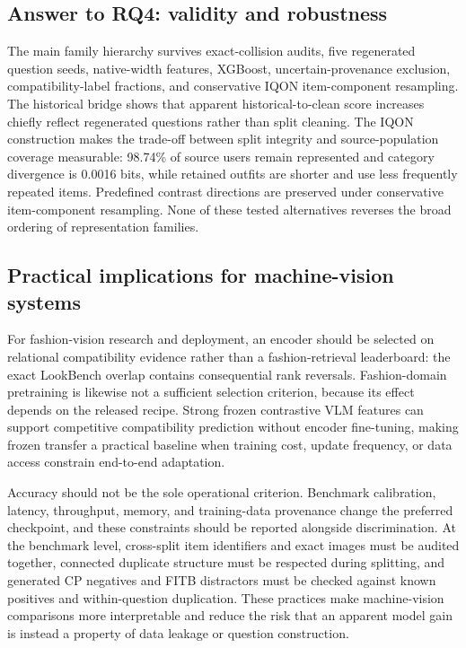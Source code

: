 \documentclass[pdflatex,sn-mathphys-num,iicol]{sn-jnl}
\begin{document}
\subsection{Answer to RQ4: validity and robustness}

The main family hierarchy survives exact-collision audits, five regenerated question seeds, native-width features, XGBoost, uncertain-provenance exclusion, compatibility-label fractions, and conservative IQON item-component resampling. The historical bridge shows that apparent historical-to-clean score increases chiefly reflect regenerated questions rather than split cleaning. The IQON construction makes the trade-off between split integrity and source-population coverage measurable: 98.74\% of source users remain represented and category divergence is 0.0016 bits, while retained outfits are shorter and use less frequently repeated items. Predefined contrast directions are preserved under conservative item-component resampling. None of these tested alternatives reverses the broad ordering of representation families.

\subsection{Practical implications for machine-vision systems}

For fashion-vision research and deployment, an encoder should be selected on relational compatibility evidence rather than a fashion-retrieval leaderboard: the exact LookBench overlap contains consequential rank reversals. Fashion-domain pretraining is likewise not a sufficient selection criterion, because its effect depends on the released recipe. Strong frozen contrastive VLM features can support competitive compatibility prediction without encoder fine-tuning, making frozen transfer a practical baseline when training cost, update frequency, or data access constrain end-to-end adaptation.

Accuracy should not be the sole operational criterion. Benchmark calibration, latency, throughput, memory, and training-data provenance change the preferred checkpoint, and these constraints should be reported alongside discrimination. At the benchmark level, cross-split item identifiers and exact images must be audited together, connected duplicate structure must be respected during splitting, and generated CP negatives and FITB distractors must be checked against known positives and within-question duplication. These practices make machine-vision comparisons more interpretable and reduce the risk that an apparent model gain is instead a property of data leakage or question construction.
\end{document}
